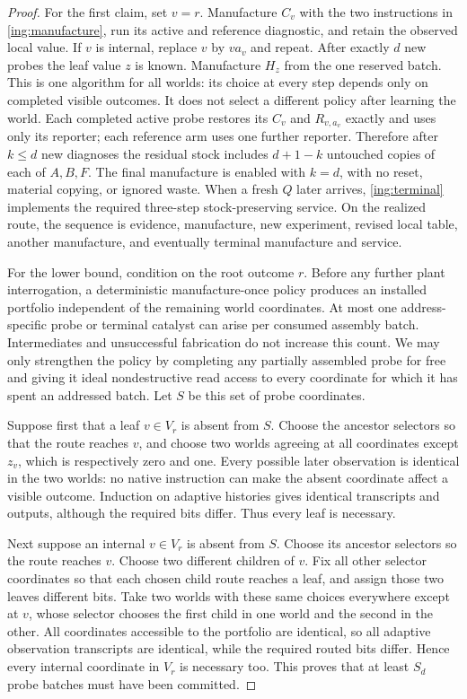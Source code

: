 \documentclass[11pt]{article}
\theoremstyle{definition}
\theoremstyle{remark}
\begin{document}
\begin{proof}
For the first claim, set $v=r$. Manufacture $C_v$ with the two instructions
in \eqref{ing:manufacture}, run its active and reference diagnostic, and
retain the observed local value. If $v$ is internal, replace $v$ by
$v a_v$ and repeat. After exactly $d$ new probes the leaf value $z$ is
known. Manufacture $H_z$ from the one reserved batch. This is one algorithm
for all worlds: its choice at every step depends only on completed visible
outcomes. It does not select a different policy after learning the world.
Each completed active probe restores its $C_v$ and $R_{v,a_v}$ exactly and
uses only its reporter; each reference arm uses one further reporter.
Therefore after $k\leq d$ new diagnoses the residual stock includes
$d+1-k$ untouched copies of each of $A,B,F$. The final manufacture is
enabled with $k=d$, with no reset, material copying, or ignored waste.
When a fresh $Q$ later arrives, \eqref{ing:terminal} implements the required
three-step stock-preserving service. On the realized route, the sequence
is evidence, manufacture, new experiment, revised local table, another
manufacture, and eventually terminal manufacture and service.

For the lower bound, condition on the root outcome $r$. Before any further
plant interrogation, a deterministic manufacture-once policy produces an
installed portfolio independent of the remaining world coordinates. At
most one address-specific probe or terminal catalyst can arise per
consumed assembly batch. Intermediates and unsuccessful fabrication do
not increase this count. We may only strengthen the policy by completing
any partially assembled probe for free and giving it ideal nondestructive
read access to every coordinate for which it has spent an addressed batch.
Let $S$ be this set of probe coordinates.

Suppose first that a leaf $v\in V_r$ is absent from $S$. Choose the ancestor
selectors so that the route reaches $v$, and choose two worlds agreeing at
all coordinates except $z_v$, which is respectively zero and one. Every
possible later observation is identical in the two worlds: no native
instruction can make the absent coordinate affect a visible outcome.
Induction on adaptive histories gives identical transcripts and outputs,
although the required bits differ. Thus every leaf is necessary.

Next suppose an internal $v\in V_r$ is absent from $S$. Choose its ancestor
selectors so the route reaches $v$. Choose two different children of $v$.
Fix all other selector coordinates so that each chosen child route reaches
a leaf, and assign those two leaves different bits. Take two worlds with
these same choices everywhere except at $v$, whose selector chooses the
first child in one world and the second in the other. All coordinates
accessible to the portfolio are identical, so all adaptive observation
transcripts are identical, while the required routed bits differ. Hence
every internal coordinate in $V_r$ is necessary too. This proves that at
least $S_d$ probe batches must have been committed.


\end{proof}
\end{document}
